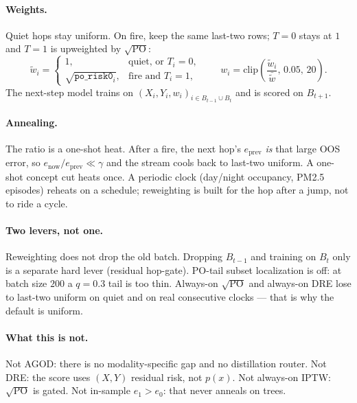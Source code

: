 \paragraph{Weights.}
Quiet hops stay uniform. On fire, keep the same last-two rows;
$T=0$ stays at $1$ and $T=1$ is upweighted by $\sqrt{\mathrm{PO}}$:
\begin{equation}
  \tilde w_i
    =
    \begin{cases}
      1, & \text{quiet, or } T_i=0,\\
      \sqrt{\texttt{po\_risk0}_i}, & \text{fire and } T_i=1,
    \end{cases}
  \qquad
  w_i
    = \mathrm{clip}\!\left(\frac{\tilde w_i}{\bar{\tilde w}},\, 0.05,\, 20\right).
\end{equation}
The next-step model trains on $(X_i,Y_i,w_i)_{i\in B_{t-1}\cup B_t}$
and is scored on $B_{t+1}$.

\paragraph{Annealing.}
The ratio is a one-shot heat. After a fire, the next hop's
$e_{\mathrm{prev}}$ \emph{is} that large OOS error, so
$e_{\mathrm{now}}/e_{\mathrm{prev}}\ll\gamma$ and the stream cools
back to last-two uniform. A one-shot concept cut heats once. A
periodic clock (day/night occupancy, PM2.5 episodes) reheats on a
schedule; reweighting is built for the hop after a jump, not to ride
a cycle.

\paragraph{Two levers, not one.}
Reweighting does not drop the old batch. Dropping $B_{t-1}$ and
training on $B_t$ only is a separate hard lever (residual hop-gate).
PO-tail subset localization is off: at batch size $200$ a $q=0.3$
tail is too thin. Always-on $\sqrt{\mathrm{PO}}$ and always-on DRE
lose to last-two uniform on quiet and on real consecutive clocks ---
that is why the default is uniform.

\paragraph{What this is not.}
Not AGOD: there is no modality-specific gap and no distillation
router. Not DRE: the score uses $(X,Y)$ residual risk, not $p(x)$.
Not always-on IPTW: $\sqrt{\mathrm{PO}}$ is gated. Not in-sample
$e_1>e_0$: that never anneals on trees.
